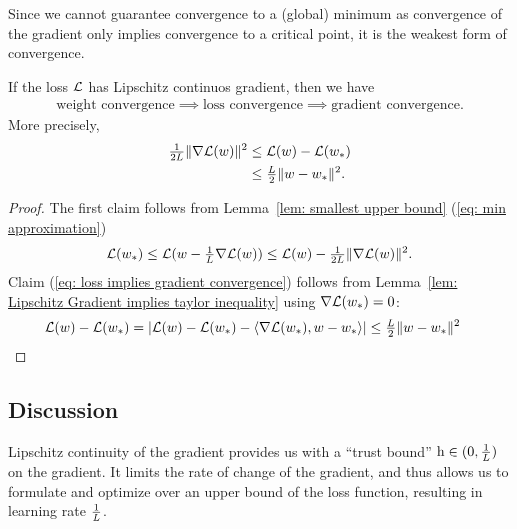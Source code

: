 Since we cannot guarantee convergence to a (global) minimum as convergence of
the gradient only implies convergence to a critical point, it is the weakest
form of convergence.

\begin{theorem}\label{thm: convergence chain}
	If the loss \(\mathcal{L}\) has Lipschitz continuos gradient, then we have
	\begin{align*}
		\text{weight convergence}
		\implies \text{loss convergence}
		\implies \text{gradient convergence}.
	\end{align*}
	More precisely,
	\begin{align}
	\label{eq: weight implies loss convergence}
		\tfrac{1}{2L}\|\nabla\mathcal{L}(w)\|^2
		&\le \mathcal{L}(w) - \mathcal{L}(w_*)\\
	\label{eq: loss implies gradient convergence}
		&\le \tfrac{L}{2}\|w-w_*\|^2.
	\end{align}
\end{theorem}
\begin{proof}
	The first claim follows from Lemma~\ref{lem: smallest upper bound} (\ref{eq: min approximation})
	\begin{align*}
		\mathcal{L}(w_*) \le \mathcal{L}(w -\tfrac{1}{L}\nabla\mathcal{L}(w))
		\le \mathcal{L}(w) - \tfrac{1}{2L}\|\nabla\mathcal{L}(w)\|^2.
	\end{align*}
	Claim (\ref{eq: loss implies gradient convergence}) follows from Lemma~\ref{lem:
	Lipschitz Gradient implies taylor inequality} using
	\(\nabla\mathcal{L}(w_*)=0\):
	\begin{align*}
		\mathcal{L}(w) - \mathcal{L}(w_*)
		= |\mathcal{L}(w) - \mathcal{L}(w_*) - \langle \nabla\mathcal{L}(w_*), w-w_*\rangle|
		&\le \tfrac{L}{2}\|w-w_*\|^2
		\qedhere
	\end{align*}
\end{proof}

\subsection{Discussion}

Lipschitz continuity of the gradient provides us with a ``trust bound''
\(\text{h}\in(0,\frac{1}{L})\) on the gradient. It limits the rate of change of the
gradient, and thus allows us to formulate and optimize over an upper bound of
the loss function, resulting in learning rate \(\frac{1}{L}\).


